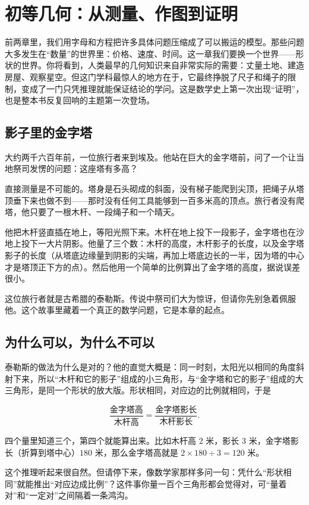 \chapter{初等几何：从测量、作图到证明}

前两章里，我们用字母和方程把许多具体问题压缩成了可以搬运的模型。那些问题大多发生在“数量”的世界里：价格、速度、时间。这一章我们要换一个世界——形状的世界。你将看到，人类最早的几何知识来自非常实际的需要：丈量土地、建造房屋、观察星空。但这门学科最惊人的地方在于，它最终挣脱了尺子和绳子的限制，变成了一门只凭推理就能保证结论的学问。这是数学史上第一次出现“证明”，也是整本书反复回响的主题第一次登场。

\section{影子里的金字塔}

大约两千六百年前，一位旅行者来到埃及。他站在巨大的金字塔前，问了一个让当地祭司发愣的问题：这座塔有多高？

直接测量是不可能的。塔身是石头砌成的斜面，没有梯子能爬到尖顶，把绳子从塔顶垂下来也做不到——那时没有任何工具能够到一百多米高的顶点。旅行者没有爬塔，他只要了一根木杆、一段绳子和一个晴天。

他把木杆竖直插在地上，等阳光照下来。木杆在地上投下一段影子，金字塔也在沙地上投下一大片阴影。他量了三个数：木杆的高度，木杆影子的长度，以及金字塔影子的长度（从塔底边缘量到阴影的尖端，再加上塔底边长的一半，因为塔的中心才是塔顶正下方的点）。然后他用一个简单的比例算出了金字塔的高度，据说误差很小。

这位旅行者就是古希腊的泰勒斯。传说中祭司们大为惊讶，但请你先别急着佩服他。这个故事里藏着一个真正的数学问题，它是本章的起点。

\section{为什么可以，为什么不可以}

泰勒斯的做法为什么是对的？他的直觉大概是：同一时刻，太阳光以相同的角度斜射下来，所以“木杆和它的影子”组成的小三角形，与“金字塔和它的影子”组成的大三角形，是同一个形状的放大版。形状相同，对应边的比例就相同，于是

\[
\frac{\text{金字塔高}}{\text{木杆高}}=\frac{\text{金字塔影长}}{\text{木杆影长}}.
\]

四个量里知道三个，第四个就能算出来。比如木杆高 $2$ 米，影长 $3$ 米，金字塔影长（折算到塔中心）$180$ 米，那么金字塔高就是 $2\times 180\div 3=120$ 米。

这个推理听起来很自然。但请停下来，像数学家那样多问一句：凭什么“形状相同”就能推出“对应边成比例”？这件事你量一百个三角形都会觉得对，可“量着对”和“一定对”之间隔着一条鸿沟。

